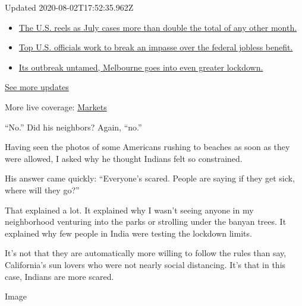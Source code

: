 Updated 2020-08-02T17:52:35.962Z

\begin{itemize}
\tightlist
\item
  \href{https://www.nytimes.com/2020/08/01/world/coronavirus-covid-19.html?action=click\&pgtype=Article\&state=default\&region=MAIN_CONTENT_1\&context=storylines_live_updates\#link-34047410}{The
  U.S. reels as July cases more than double the total of any other
  month.}
\item
  \href{https://www.nytimes.com/2020/08/01/world/coronavirus-covid-19.html?action=click\&pgtype=Article\&state=default\&region=MAIN_CONTENT_1\&context=storylines_live_updates\#link-780ec966}{Top
  U.S. officials work to break an impasse over the federal jobless
  benefit.}
\item
  \href{https://www.nytimes.com/2020/08/01/world/coronavirus-covid-19.html?action=click\&pgtype=Article\&state=default\&region=MAIN_CONTENT_1\&context=storylines_live_updates\#link-2bc8948}{Its
  outbreak untamed, Melbourne goes into even greater lockdown.}
\end{itemize}

\href{https://www.nytimes.com/2020/08/01/world/coronavirus-covid-19.html?action=click\&pgtype=Article\&state=default\&region=MAIN_CONTENT_1\&context=storylines_live_updates}{See
more updates}

More live coverage:
\href{https://www.nytimes.com/live/2020/07/31/business/stock-market-today-coronavirus?action=click\&pgtype=Article\&state=default\&region=MAIN_CONTENT_1\&context=storylines_live_updates}{Markets}

``No.'' Did his neighbors? Again, ``no.''

Having seen the photos of some Americans rushing to beaches as soon as
they were allowed, I asked why he thought Indians felt so constrained.

His answer came quickly: ``Everyone's scared. People are saying if they
get sick, where will they go?''

That explained a lot. It explained why I wasn't seeing anyone in my
neighborhood venturing into the parks or strolling under the banyan
trees. It explained why few people in India were testing the lockdown
limits.

It's not that they are automatically more willing to follow the rules
than say, California's sun lovers who were not nearly social distancing.
It's that in this case, Indians are more scared.

Image


